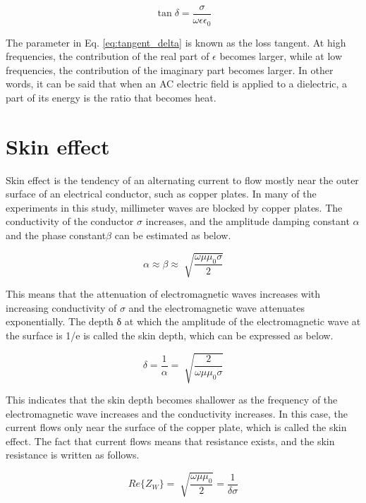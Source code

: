 \documentclass[a4paper,12pt]{report}
\begin{document}
\begin{equation} \label{eq:tangent_delta}
  \tan \delta = \frac{\sigma}{\omega\epsilon\epsilon_0}
\end{equation}

The parameter in Eq. \ref{eq:tangent_delta} is known as the loss tangent.
At high frequencies, the contribution of the real part of $\epsilon$ becomes larger,
while at low frequencies, the contribution of the imaginary part becomes larger.
In other words, it can be said that when an AC electric field is applied to a dielectric,
a part of its energy is the ratio that becomes heat.

\section{Skin effect}

Skin effect is the tendency of an alternating current to flow mostly near
the outer surface of an electrical conductor, such as copper plates.
In many of the experiments in this study, 
millimeter waves are blocked by copper plates.
The conductivity of the conductor $\sigma$ increases,
and the amplitude damping constant $\alpha$ and the phase constant$\beta$
can be estimated as below.

\begin{equation}
  \alpha \approx \beta \approx \sqrt[]{\frac{\omega\mu\mu_0\sigma}{2}}
\end{equation}

This means that the attenuation of electromagnetic waves increases with increasing conductivity of $\sigma$
and the electromagnetic wave attenuates exponentially.
The depth δ at which the amplitude of the electromagnetic wave
at the surface is 1/e is called the skin depth, which can be expressed as below.

\begin{equation}
  \delta = \frac{1}{\alpha} = \sqrt[]{\frac{2}{\omega\mu\mu_0\sigma}}
\end{equation}

This indicates that the skin depth becomes shallower
as the frequency of the electromagnetic wave increases and the conductivity increases.
In this case, the current flows only near the surface of the copper plate,
which is called the skin effect.
The fact that current flows means that resistance exists,
and the skin resistance is written as follows.

\begin{equation}
  Re\{Z_W\} = \sqrt[]{\frac{\omega\mu\mu_0}{2}} = \frac{1}{\delta\sigma}
\end{equation}
\end{document}
